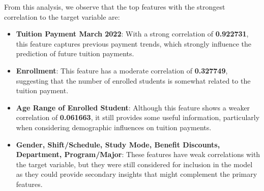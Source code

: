 \documentclass{article}
\begin{document}
From this analysis, we observe that the top features with the strongest correlation to the target variable are:

\begin{itemize}
    \item \textbf{Tuition Payment March 2022}: With a strong correlation of \textbf{0.922731}, this feature captures previous payment trends, which strongly influence the prediction of future tuition payments.
    \item \textbf{Enrollment}: This feature has a moderate correlation of \textbf{0.327749}, suggesting that the number of enrolled students is somewhat related to the tuition payment.
    \item \textbf{Age Range of Enrolled Student}: Although this feature shows a weaker correlation of \textbf{0.061663}, it still provides some useful information, particularly when considering demographic influences on tuition payments.
    \item \textbf{Gender, Shift/Schedule, Study Mode, Benefit Discounts, Department, Program/Major}: These features have weak correlations with the target variable, but they were still considered for inclusion in the model as they could provide secondary insights that might complement the primary features.
\end{itemize}
\end{document}
